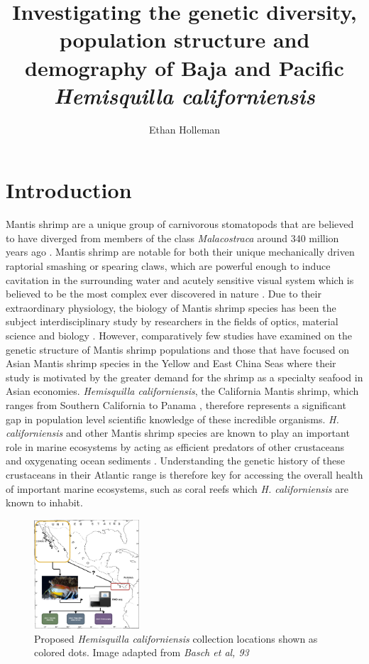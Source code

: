 \documentclass[11pt]{article}
\title{Investigating the genetic diversity, population structure and demography of Baja and Pacific \emph{Hemisquilla californiensis}}
\date{}
\author{Ethan Holleman}
\begin{document}
\maketitle
\thispagestyle{empty}

\section*{Introduction}


Mantis shrimp are a unique group of carnivorous stomatopods that are believed to have diverged from members of the class \emph{Malacostraca} around 340 million years ago \cite{VanDerWal2017}. Mantis shrimp are notable for both their unique mechanically driven raptorial smashing or spearing claws, which are powerful enough to induce cavitation in the surrounding water \cite{Patek2004, Patek2005} and acutely sensitive visual system which is believed to be the most complex ever discovered in nature \cite{Cronin2014, Milius2012}. Due to their extraordinary physiology, the biology of Mantis shrimp species has been the subject interdisciplinary study by researchers in the fields of optics, material science and biology \cite{Huang2020, Altaqui2021, Donohue2018}. However, comparatively few studies have examined on the genetic structure of Mantis shrimp populations and those that have focused on Asian Mantis shrimp species in the Yellow and East China Seas \cite{Yang2018} where their study is motivated by the greater demand for the shrimp as a specialty seafood in Asian economies. \emph{Hemisquilla californiensis}, the California Mantis shrimp, which ranges from Southern California to Panama \cite{Basch1993BiogeographyOH}, therefore represents a significant gap in population level scientific knowledge of these incredible organisms. \emph{H. californiensis} and other Mantis shrimp species are known to play an important role in marine ecosystems by acting as efficient predators of other crustaceans and oxygenating ocean sediments \cite{Antony2010}. Understanding the genetic history of these crustaceans in their Atlantic range is therefore key for accessing the overall health of important marine ecosystems, such as coral reefs which \emph{H. californiensis} are known to inhabit. 

\begin{figure}
	\begin{center}
		\includegraphics[width=0.35\textwidth]{images/sampling_locations.png}
	\end{center}
	\caption{Proposed \emph{Hemisquilla californiensis} collection locations shown as colored dots. Image adapted from \emph{Basch et al, 93}}
\end{figure}
\end{document}
